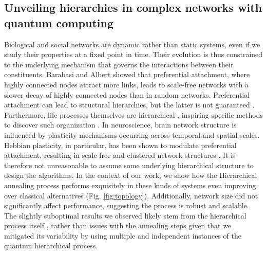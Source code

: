 \documentclass[pdflatex,sn-mathphys-num]{sn-jnl}%
\begin{document}
\subsection*{Unveiling hierarchies in complex networks with quantum computing}
Biological and social networks are dynamic rather than static systems, even if we study their properties at a fixed point in time. Their evolution is thus constrained to the underlying mechanism that governs the interactions between their constituents. Barabasi and Albert \cite{Barabasi1999} showed that preferential attachment, where highly connected nodes attract more links, leads to scale-free networks with a slower decay of highly connected nodes than in random networks. Preferential attachment can lead to structural hierarchies, but the latter is not guaranteed \cite{Holme2002,barabasi2003scale}. Furthermore, life processes themselves are hierarchical \cite{oltvai2002life,alon2003biological}, inspiring specific methods to discover such organization \cite{SalesPardo-etal_2007}. In neuroscience, brain network structure is influenced by plasticity mechanisms occurring across temporal and spatial scales. Hebbian plasticity, in particular, has been shown to modulate preferential attachment, resulting in scale-free and clustered network structures \cite{Lynn2024}. It is therefore not unreasonable to assume some underlying hierarchical structure to design the algorithms. In the context of our work, we show how the Hierarchical annealing process performs exquisitely in these kinds of systems even improving over classical alternatives (Fig. \ref{fig:topology}). Additionally, network size did not significantly affect performance, suggesting the process is robust and scalable. The slightly suboptimal results we observed likely stem from the hierarchical process itself \cite{Arenas2008}, rather than issues with the annealing steps given that we mitigated its variability by using multiple and independent instances of the quantum hierarchical process. 
\end{document}
